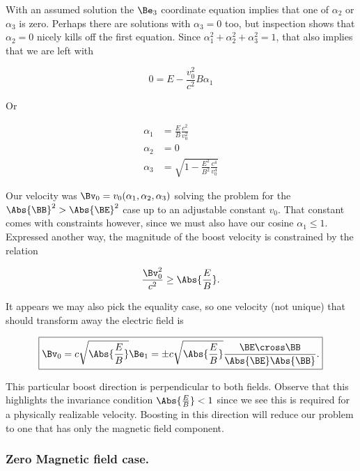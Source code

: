 With an assumed solution the $\Be_3$ coordinate equation implies that one of $\alpha_2$ or $\alpha_3$ is zero.  Perhaps there are solutions with $\alpha_3 = 0$ too, but inspection shows that $\alpha_2 = 0$ nicely kills off the first equation.  Since $\alpha_1^2 + \alpha_2^2 + \alpha_3^2 = 1$, that also implies that we are left with

\begin{equation}\label{eqn:relElectroDynProblemSet3:1680}
0 = E - \frac{v_0^2}{c^2} B \alpha_1 
\end{equation}

Or

\begin{align}\label{eqn:relElectroDynProblemSet3:1700}
\alpha_1 &= \frac{E}{B} \frac{c^2}{v_0^2} \\
\alpha_2 &= 0 \\
\alpha_3 &= \sqrt{
1 - \frac{E^2}{B^2} \frac{c^4}{v_0^4} 
}
\end{align}

Our velocity was $\Bv_0 = v_0 (\alpha_1, \alpha_2, \alpha_3)$ solving the problem for the $\Abs{\BB}^2 > \Abs{\BE}^2$ case up to an adjustable constant $v_0$.  That constant comes with constraints however, since we must also have our cosine $\alpha_1 \le 1$.  Expressed another way, the magnitude of the boost velocity is constrained by the relation

\begin{equation}\label{eqn:relElectroDynProblemSet3:1720}
\frac{\Bv_0^2}{c^2} \ge \Abs{\frac{E}{B}}.
\end{equation}

It appears we may also pick the equality case, so one velocity (not unique) that should transform away the electric field is

\begin{equation}\label{eqn:relElectroDynProblemSet3:1860}
\boxed{
\Bv_0 = c \sqrt{\Abs{\frac{E}{B}}} \Be_1 = \pm c \sqrt{\Abs{\frac{E}{B}}} \frac{\BE \cross \BB}{\Abs{\BE} \Abs{\BB}}.
}
\end{equation}

This particular boost direction is perpendicular to both fields.  Observe that this highlights the invariance condition $\Abs{\frac{E}{B}} < 1$ since we see this is required for a physically realizable velocity.  Boosting in this direction will reduce our problem to one that has only the magnetic field component.

\subsubsection{Zero Magnetic field case.}

